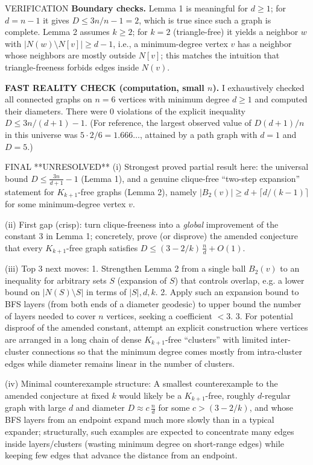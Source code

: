 VERIFICATION
\textbf{Boundary checks.}
Lemma 1 is meaningful for $d\ge1$; for $d=n-1$ it gives $D\le 3n/n-1=2$, which is
true since such a graph is complete.
Lemma 2 assumes $k\ge2$; for $k=2$ (triangle-free) it yields a neighbor $w$ with
$|N(w)\setminus N[v]|\ge d-1$, i.e., a minimum-degree vertex $v$ has a neighbor
whose neighbors are mostly outside $N[v]$; this matches the intuition that
triangle-freeness forbids edges inside $N(v)$.

\textbf{FAST REALITY CHECK (computation, small $n$).}
I exhaustively checked all connected graphs on $n=6$ vertices with minimum degree
$d\ge1$ and computed their diameters.
There were $0$ violations of the explicit inequality
$D\le 3n/(d+1)-1$.
(For reference, the largest observed value of $D(d+1)/n$ in this universe was
$5\cdot 2/6=1.666\ldots$, attained by a path graph with $d=1$ and $D=5$.)

FINAL
**UNRESOLVED**
(i) Strongest proved partial result here: the universal bound
$D\le \frac{3n}{d+1}-1$ (Lemma 1), and a genuine clique-free ``two-step
expansion'' statement for $K_{k+1}$-free graphs (Lemma 2), namely
$|B_2(v)|\ge d+\lceil d/(k-1)\rceil$ for some minimum-degree vertex $v$.

(ii) First gap (crisp): turn clique-freeness into a \emph{global} improvement of
the constant $3$ in Lemma 1; concretely, prove (or disprove) the amended
conjecture that every $K_{k+1}$-free graph satisfies
$D\le (3-2/k)\,\frac{n}{d}+O(1)$.

(iii) Top 3 next moves:
1. Strengthen Lemma 2 from a single ball $B_2(v)$ to an inequality for arbitrary
sets $S$ (expansion of $S$) that controls overlap, e.g. a lower bound on
$|N(S)\setminus S|$ in terms of $|S|,d,k$.
2. Apply such an expansion bound to BFS layers (from both ends of a diameter
geodesic) to upper bound the number of layers needed to cover $n$ vertices,
seeking a coefficient $<3$.
3. For potential disproof of the amended constant, attempt an explicit
construction where vertices are arranged in a long chain of dense
$K_{k+1}$-free ``clusters'' with limited inter-cluster connections so that the
minimum degree comes mostly from intra-cluster edges while diameter remains
linear in the number of clusters.

(iv) Minimal counterexample structure:
A smallest counterexample to the amended conjecture at fixed $k$ would likely be
a $K_{k+1}$-free, roughly $d$-regular graph with large $d$ and diameter
$D\approx c\,\frac{n}{d}$ for some $c>(3-2/k)$, and whose BFS layers from an
endpoint expand much more slowly than in a typical expander; structurally, such
examples are expected to concentrate many edges inside layers/clusters (wasting
minimum degree on short-range edges) while keeping few edges that advance the
distance from an endpoint.




